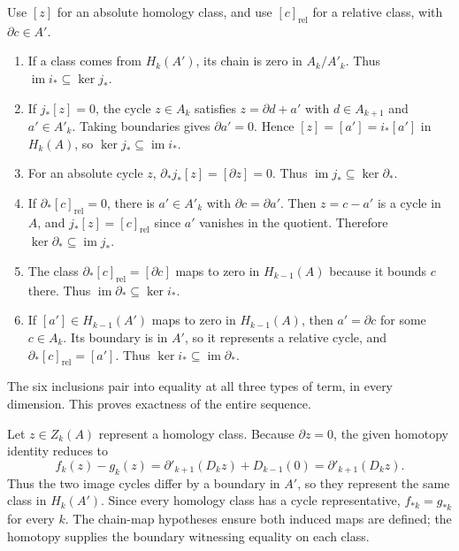 Use $[z]$ for an absolute homology class, and use $[c]_{\mathrm{rel}}$ for a relative class, with $\partial c\in A'$.
\begin{enumerate}[label=\textbf{(\alph*)}]
\item If a class comes from $H_k(A')$, its chain is zero in $A_k/A'_k$. Thus $\operatorname{im}i_*\subseteq\ker j_*$.
\item If $j_*[z]=0$, the cycle $z\in A_k$ satisfies $z=\partial d+a'$ with $d\in A_{k+1}$ and $a'\in A'_k$. Taking boundaries gives $\partial a'=0$. Hence $[z]=[a']=i_*[a']$ in $H_k(A)$, so $\ker j_*\subseteq\operatorname{im}i_*$.
\item For an absolute cycle $z$, $\partial_*j_*[z]=[\partial z]=0$. Thus $\operatorname{im}j_*\subseteq\ker\partial_*$.
\item If $\partial_*[c]_{\mathrm{rel}}=0$, there is $a'\in A'_k$ with $\partial c=\partial a'$. Then $z=c-a'$ is a cycle in $A$, and $j_*[z]=[c]_{\mathrm{rel}}$ since $a'$ vanishes in the quotient. Therefore $\ker\partial_*\subseteq\operatorname{im}j_*$.
\item The class $\partial_*[c]_{\mathrm{rel}}=[\partial c]$ maps to zero in $H_{k-1}(A)$ because it bounds $c$ there. Thus $\operatorname{im}\partial_*\subseteq\ker i_*$.
\item If $[a']\in H_{k-1}(A')$ maps to zero in $H_{k-1}(A)$, then $a'=\partial c$ for some $c\in A_k$. Its boundary is in $A'$, so it represents a relative cycle, and $\partial_*[c]_{\mathrm{rel}}=[a']$. Thus $\ker i_*\subseteq\operatorname{im}\partial_*$.
\end{enumerate}
The six inclusions pair into equality at all three types of term, in every dimension. This proves exactness of the entire sequence.

Let $z\in Z_k(A)$ represent a homology class. Because $\partial z=0$, the given homotopy identity reduces to
\[
f_k(z)-g_k(z)=\partial'_{k+1}(D_kz)+D_{k-1}(0)
=\partial'_{k+1}(D_kz).
\]
Thus the two image cycles differ by a boundary in $A'$, so they represent the same class in $H_k(A')$.
Since every homology class has a cycle representative, $f_{*k}=g_{*k}$ for every $k$. The chain-map hypotheses ensure both induced maps are defined; the homotopy supplies the boundary witnessing equality on each class.
